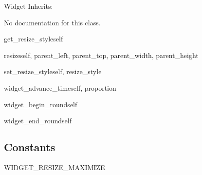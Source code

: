 \begin{classdesc*}{Widget}
Inherits:

No documentation for this class.

\begin{methoddesc}{get_resize_style}{self}
\end{methoddesc}

\begin{methoddesc}{resize}{self, parent_left, parent_top, parent_width, parent_height}
\end{methoddesc}

\begin{methoddesc}{set_resize_style}{self, resize_style}
\end{methoddesc}

\begin{methoddesc}{widget_advance_time}{self, proportion}
\end{methoddesc}

\begin{methoddesc}{widget_begin_round}{self}
\end{methoddesc}

\begin{methoddesc}{widget_end_round}{self}
\end{methoddesc}

\end{classdesc*}

\subsection{Constants}
\begin{datadesc}{WIDGET_RESIZE_MAXIMIZE}
\end{datadesc}
